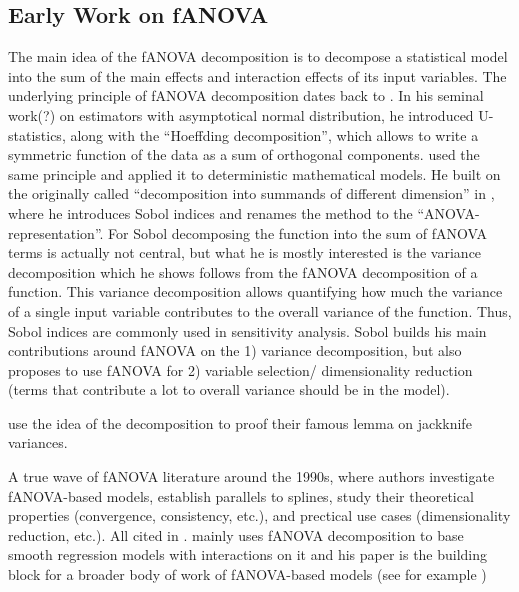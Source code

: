 
\subsection{Early Work on fANOVA}
The main idea of the fANOVA decomposition is to decompose a statistical model into the sum of the main effects and interaction effects of its input variables. The underlying principle of fANOVA decomposition dates back to \cite{hoeffding1948}. In his seminal work(?) on estimators with asymptotical normal distribution, he introduced U-statistics, along with the ``Hoeffding decomposition'', which allows to write a symmetric function of the data as a sum of orthogonal components.
\cite{sobol1993sensitivity} used the same principle and applied it to deterministic mathematical models.
He built on the originally called ``decomposition into summands of different dimension'' in \cite{sobol2001}, where he introduces Sobol indices and renames the method to the ``ANOVA-representation''. For Sobol decomposing the function into the sum of fANOVA terms is actually not central, but what he is mostly interested is the variance decomposition which he shows follows from the fANOVA decomposition of a function.
This variance decomposition allows quantifying how much the variance of a single input variable contributes to the overall variance of the function. Thus, Sobol indices are commonly used in sensitivity analysis.
Sobol builds his main contributions around fANOVA on the 1) variance decomposition, but also proposes to use fANOVA for 2) variable selection/ dimensionality reduction (terms that contribute a lot to overall variance should be in the model).\par

\cite{efron1981} use the idea of the decomposition to proof their famous lemma on jackknife variances.

A true wave of fANOVA literature around the 1990s, where authors investigate fANOVA-based models, establish parallels to splines, study their theoretical properties (convergence, consistency, etc.), and prectical use cases (dimensionality reduction, etc.). All cited in \cite{huang1998a}.
\cite{stone1994} mainly uses fANOVA decomposition to base smooth regression models with interactions on it and his paper is the building block for a broader body of work of fANOVA-based models (see for example \cite{Huang1996, huang1998a})

